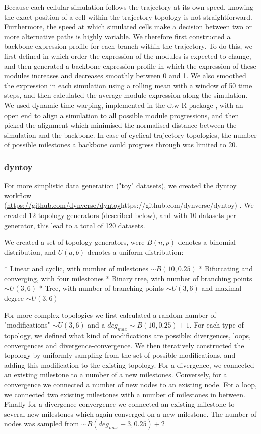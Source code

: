 Because each cellular simulation follows the trajectory at its own speed, knowing the exact position of a cell within the trajectory topology is not straightforward. Furthermore, the speed at  which simulated cells make a decision between two or more alternative paths is highly variable. We therefore first constructed a backbone expression profile for each branch within the trajectory. To do this, we first defined in which order the expression of the modules is expected to change, and then generated a backbone expression profile in which the expression of these modules increases and decreases smoothly between 0 and 1.  We also smoothed the expression in each simulation using a rolling mean with a window of 50 time steps, and then calculated the average module expression along the simulation.  We used dynamic time warping, implemented in the dtw R package \cite{giorgino_computingvisualizingdynamic_2009,tormene_matchingincompletetime_2009}, with an open end to align a simulation to all possible module progressions, and then picked the alignment which minimised the normalised distance between the simulation and the backbone. In case of cyclical trajectory topologies, the number of possible milestones a backbone could progress through was limited to 20.

\subsubsection{dyntoy}

For more simplistic data generation ("toy" datasets), we created the dyntoy workflow (\url{https://github.com/dynverse/dyntoy}{https://github.com/dynverse/dyntoy}) . We created 12 topology generators (described below), and with 10 datasets per generator, this lead to a total of 120 datasets.

We created a set of topology generators, were $B(n, p)$ denotes a binomial distribution, and $U(a, b)$ denotes a uniform distribution:

* Linear and cyclic, with number of milestones $\sim B(10, 0.25)$
* Bifurcating and converging, with four milestones
* Binary tree, with number of branching points $\sim U(3, 6)$
* Tree, with number of branching points $\sim U(3, 6)$ and maximal degree $\sim U(3, 6)$

For more complex topologies we first calculated a random number of "modifications" $\sim U(3, 6)$ and a $\textit{deg}_{\textit{max}} \sim B(10, 0.25) + 1$. For each type of topology, we defined what kind of modifications are possible: divergences, loops, convergences and divergence-convergence. We then iteratively constructed the topology by uniformly sampling from the set of possible modifications, and adding this modification to the existing topology. For a divergence, we connected an existing milestone to a number of a new milestones. Conversely, for a convergence we connected a number of new nodes to an existing node. For a loop, we connected two existing milestones with a number of milestones in between. Finally for a divergence-convergence we connected an existing milestone to several new milestones which again converged on a new milestone. The number of nodes was sampled from $\sim B(\textit{deg}_{\textit{max}} - 3, 0.25) + 2$

